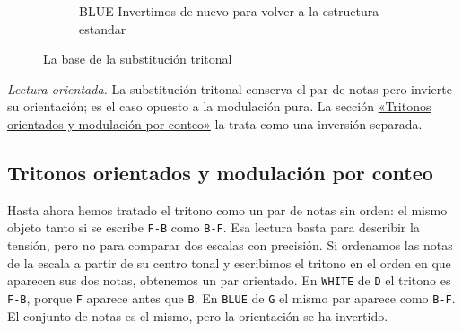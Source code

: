 \documentclass[]{report}
\begin{document}
\begin{figure}[H]
\begin{subfigure}{0.29\textwidth}
	\end{subfigure}
	\hfill
	\begin{subfigure}{0.29\textwidth}
		\centering
		\captionsetup{width=\textwidth}
		\caption{\textsf{BLUE} Invertimos de nuevo para volver a la estructura estandar}

	\end{subfigure}
	\hfill
	\caption{La base de la substitución tritonal}\label{fig:tritonal-substitution}
\end{figure}

\emph{Lectura orientada.} La substitución tritonal conserva el par de notas
pero invierte su orientación; es el caso opuesto a la modulación pura. La
sección \hyperref[sec:tritonos-orientados]{«Tritonos orientados y modulación por conteo»} la trata como una inversión separada.

\subsection{Tritonos orientados y modulación por conteo}
\label{sec:tritonos-orientados}

Hasta ahora hemos tratado el tritono como un par de notas sin orden: el mismo
objeto tanto si se escribe \texttt{F-B} como \texttt{B-F}. Esa lectura basta
para describir la tensión, pero no para comparar dos escalas con precisión. Si
ordenamos las notas de la escala a partir de su centro tonal y escribimos el
tritono en el orden en que aparecen sus dos notas, obtenemos un par orientado.
En \texttt{WHITE} de \texttt{D} el tritono es \texttt{F-B}, porque \texttt{F}
aparece antes que \texttt{B}. En \texttt{BLUE} de \texttt{G} el mismo par
aparece como \texttt{B-F}. El conjunto de notas es el mismo, pero la orientación
se ha invertido.
\end{document}
